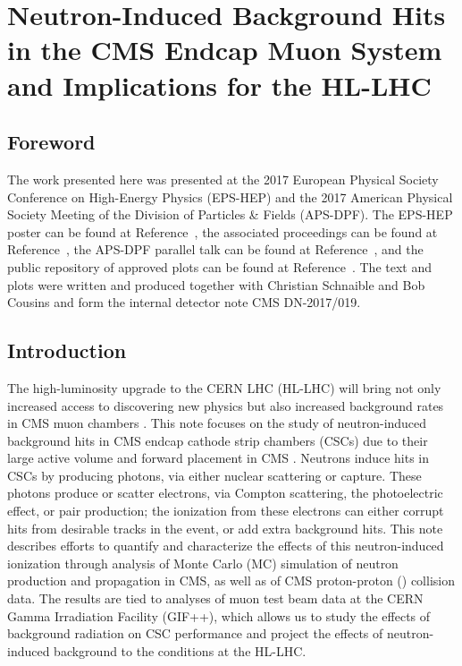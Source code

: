 \chapter{Neutron-Induced Background Hits in the CMS Endcap Muon System and Implications for the HL-LHC}
\label{chap:neutron}
\section{Foreword}
The work presented here was presented at the 2017 European Physical Society Conference on High-Energy Physics (EPS-HEP) and the 2017 American Physical Society Meeting of the Division of Particles \& Fields (APS-DPF). The EPS-HEP poster can be found at Reference~\cite{Dasgupta:Poster}, the associated proceedings can be found at Reference~\cite{Dasgupta:Proceedings}, the APS-DPF parallel talk can be found at Reference~\cite{Schnaible:Talk}, and the public repository of approved plots can be found at Reference~\cite{NeutronTwiki}. The text and plots were written and produced together with Christian Schnaible and Bob Cousins and form the internal detector note CMS DN-2017/019.

\section{Introduction}
\label{sec:intro}
The high-luminosity upgrade to the CERN LHC (HL-LHC) will bring not only increased access to discovering new physics but also increased background rates in CMS muon chambers \cite{Evans:2008zzb,Apollinari:2116337}. This note focuses on the study of neutron-induced background hits in CMS endcap cathode strip chambers (CSCs) due to their large active volume and forward placement in CMS \cite{CMS:1997dma,Chatrchyan:2009hb}. Neutrons induce hits in CSCs by producing photons, via either nuclear scattering or capture. These photons produce or scatter electrons, via Compton scattering, the photoelectric effect, or pair production; the ionization from these electrons can either corrupt hits from desirable tracks in the event, or add extra background hits. This note describes efforts to quantify and characterize the effects of this neutron-induced ionization through analysis of Monte Carlo (MC) simulation of neutron production and propagation in CMS, as well as of CMS proton-proton (\pp) collision data. The results are tied to analyses of muon test beam data at the CERN Gamma Irradiation Facility (GIF++), which allows us to study the effects of background radiation on CSC performance and project the effects of neutron-induced background to the conditions at the HL-LHC.

